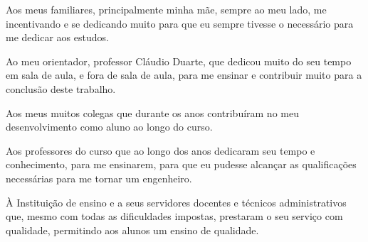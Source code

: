 \begin{agradecimentos}

Aos meus familiares, principalmente minha mãe, sempre ao meu lado, me incentivando e se dedicando muito para que eu sempre tivesse o necessário para me dedicar aos estudos. 

Ao meu orientador, professor Cláudio Duarte, que dedicou muito do seu tempo em sala de aula, e fora de sala de aula, para me ensinar e contribuir muito para a conclusão deste trabalho. 

Aos meus muitos colegas que durante os anos contribuíram no meu desenvolvimento como aluno ao longo do curso. 

Aos professores do curso que ao longo dos anos dedicaram seu tempo e conhecimento, para me ensinarem, para que eu pudesse alcançar as qualificações necessárias para me tornar um engenheiro. 

À Instituição de ensino e a seus servidores docentes e técnicos administrativos  que, mesmo com todas as dificuldades impostas, prestaram o seu serviço com qualidade, permitindo aos alunos um ensino de qualidade.

\end{agradecimentos}